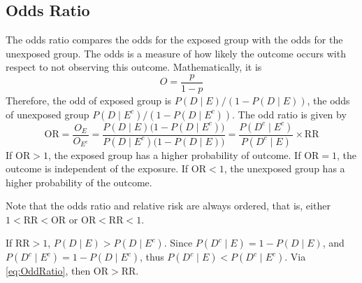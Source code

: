 \subsection{Odds Ratio}
The odds ratio compares the odds for the exposed group with the odds for the unexposed group. The odds is a measure of how likely the outcome occurs with respect to not observing this outcome. Mathematically, it is 
\begin{equation}\label{eq:OddsEquation}
    O=\frac{p}{1-p}
\end{equation}
Therefore, the odd of exposed group is $P(D\mid E)/(1-P(D\mid E))$, the odds of unexposed group $P(D\mid E^c)/(1-P(D\mid E^c))$. The odd ratio is given by
\begin{equation}\label{eq:OddRatio}
    \mathrm{OR}=\frac{O_E}{O_{E^c}}=\frac{P(D\mid E)\big(1-P(D\mid E^c)\big)}{P(D\mid E^c)\big(1-P(D\mid E)\big)}=\frac{P(D^c\mid E^c)}{P(D^c\mid E)}\times\mathrm{RR}
\end{equation}
If $\mathrm{OR}>1$, the exposed group has a higher probability of outcome. If $\mathrm{OR}=1$, the outcome is independent of the exposure. If $\mathrm{OR}<1$, the unexposed group has a higher probability of the outcome.

Note that the odds ratio and relative risk are always ordered, that is, either $1<\mathrm{RR}<\mathrm{OR}$ or $\mathrm{OR}<\mathrm{RR}<1$.
\begin{proofbox}
    If $\mathrm{RR}>1$, $P(D\mid E)>P(D\mid E^c)$. Since $P(D^c\mid E)=1-P(D\mid E)$, and $P(D^c\mid E^c)=1-P(D\mid E^c)$, thus $P(D^c\mid E)<P(D^c\mid E^c)$. Via \cref{eq:OddRatio}, then $\mathrm{OR}>\mathrm{RR}$.
\end{proofbox}

